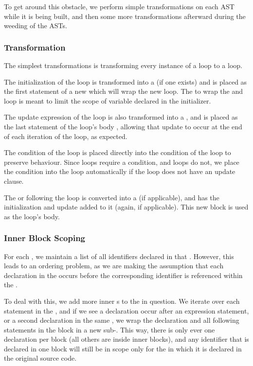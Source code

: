 \documentclass[pdftex,11pt,a4paper]{article}
\begin{document}
To get around this obstacle, we perform simple transformations on each
AST while it is being built, and then some more transformations
afterward during the weeding of the ASTs.


\subsubsection{ Transformation}

The simplest transformations is transforming every instance of a
 loop to a  loop.

The initialization of the  loop is transformed into a 
(if one exists) and is placed as the first statement of a new
 which will wrap the new  loop. The 
to wrap the  and loop is meant to limit the scope of
variable declared in the  initializer.

The update expression of the  loop is also transformed into a
, and is placed as the last statement of the
 loop's body , allowing that update to occur at the
end of each iteration of the loop, as expected.

The condition of the  loop is placed directly into the condition of
the  loop to preserve behaviour. Since  loops require a
condition, and  loops do not, we place the  condition into
the  loop automatically if the  loop does not have an
update clause.

The  or  following the  loop is converted
into a  (if applicable), and has the initialization and update
added to it (again, if applicable). This new block is used as the 
loop's body.

\subsubsection{Inner Block Scoping}

For each , we maintain a list of all identifiers declared in
that . However, this leads to an ordering problem, as we are making
the assumption that each declaration in the  occurs before the
corresponding identifier is referenced within the .

To deal with this, we add more inner s to the  in
question. We iterate over each statement in the , and if we see a
declaration occur after an expression statement, or a second
declaration in the same , we wrap the declaration and all
following statements in the block in a new sub-. This way,
there is only ever one declaration per block (all others are inside
inner blocks), and any identifier that is declared in one block will
still be in scope only for the  in which it is declared in
the original source code.
\end{document}
